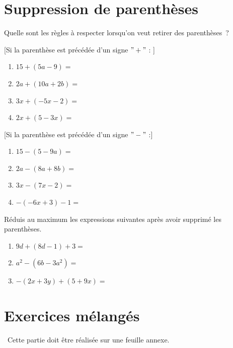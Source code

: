 \documentclass[../../syllabus_1.tex]{subfiles}
\begin{document}
\newpage
\section{Suppression de parenthèses}
Quelle sont les règles à respecter lorsqu'on veut retirer des parenthèses~?

[Si la parenthèse est précédée d'un signe \(" + "\) : ]
\exemples
\begin{enumerate}[itemsep=1.5cm, cols=2, label=]
    \item \(15 + (5a - 9) =\)
    \item \(2a + (10a + 2b) =\)
    \item \(3x + ( - 5x - 2) =\)
    \item \(2x + (5-3x)=\)
\end{enumerate}
\vspace{1cm}

[Si la parenthèse est précédée d'un signe \(" - "\) :]
\exemples
\begin{enumerate}[itemsep=1.5cm, cols=2, label=]
    \item \(15 - (5 - 9a) =\)
    \item \(2a - (8a + 8b) =\)
    \item \(3x - (7x - 2) =\)
    \item \(-(-6x+3) - 1=\)
\end{enumerate}
\vspace{1.5cm}

\begin{exercise}
    Réduis au maximum les expressions suivantes après avoir supprimé les parenthèses.
    \begin{enumerate}[cols=2, itemsep=2cm]
        \item \(9d+(8d-1)+3=\)
        \item \(a^2 - (6b-3a^2)=\)
        \item \(-(2x+3y) + (5+9x)=\)
    \end{enumerate}
\end{exercise}

\newpage
\section{Exercices mélangés}
~Cette partie doit être réalisée sur une feuille annexe.
\setcounter{exercise}{0}
\end{document}
